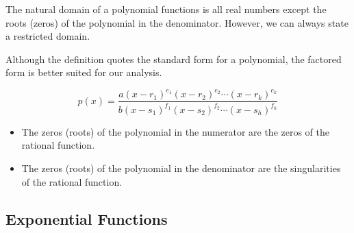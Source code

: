 \documentclass{ximera}
\begin{document}
The natural domain of a polynomial functions is all real numbers except the roots (zeros) of the polynomial in the denominator.  However, we can always state a restricted domain.








Although the definition quotes the standard form for a polynomial, the factored form is better suited for our analysis.

\[
p(x) = \frac{ a (x - r_1)^{e_1} (x - r_2)^{e_2} \cdots  (x - r_k)^{e_k} } { b (x - s_1)^{f_1} (x - s_2)^{f_2} \cdots  (x - s_h)^{f_h} }
\]








\begin{itemize}
\item The zeros (roots) of the polynomial in the numerator are the zeros of the rational function.
\item The zeros (roots) of the polynomial in the denominator are the singularities of the rational function.
\end{itemize}





















\subsection{Exponential Functions}
\end{document}
